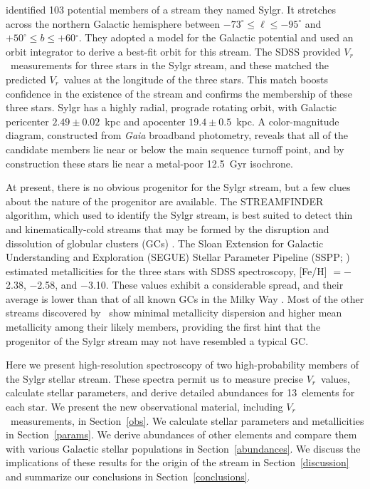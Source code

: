 \documentclass[twocolumn,tighten]{aastex62}
\newcommand{\feh}{{\mathrm{[Fe/H]}}}
\newcommand{\degree}{$^{\circ}$}
\newcommand{\rv}{$V_{r}$}
\begin{document}
identified 103 potential members of a stream
they named Sylgr.
It stretches across the
northern Galactic hemisphere between $-73^\circ \leq \ell \leq -95^\circ$
and $+50^\circ \leq b \leq +60$\degree.
They adopted a model for the Galactic potential and 
used an orbit integrator to derive a best-fit orbit for this stream.
The SDSS provided \rv\ measurements for 
three stars in the Sylgr stream, and these matched the predicted
\rv\ values at the longitude of the three stars.
This match boosts confidence in the existence of the stream and
confirms the membership of these three stars.
Sylgr has a highly radial, prograde rotating orbit,
with Galactic pericenter $2.49 \pm 0.02$~kpc
and apocenter $19.4 \pm 0.5$~kpc.
A color-magnitude diagram, constructed from \textit{Gaia}
broadband photometry, reveals that all of the candidate members
lie near or below the main sequence turnoff point, and
by construction these stars lie near a metal-poor 
12.5~Gyr isochrone.

At present, there is no obvious progenitor for the Sylgr stream,
but a few clues about the nature of the progenitor are available.
The STREAMFINDER algorithm, which  used to
identify the Sylgr stream,
is best suited to detect thin and kinematically-cold streams
that may be formed by the disruption and dissolution of
globular clusters (GCs) \citep{malhan18a,malhan18c}.
The Sloan Extension for Galactic Understanding and Exploration (SEGUE) 
Stellar Parameter Pipeline (SSPP; \citealt{lee08}) 
estimated metallicities
for the three stars with SDSS spectroscopy,
[Fe/H] $= -$2.38, $-$2.58, and $-$3.10.
These values exhibit a considerable spread, and their average
is lower than that of all known GCs in the Milky Way 
\citep[$\feh > -2.4$;][]{carretta14ter8}.
Most of the other streams discovered by \
show minimal metallicity dispersion and higher mean metallicity
among their likely members,
providing the first hint that the progenitor of the Sylgr stream may not
have resembled a typical GC.~

Here we present high-resolution spectroscopy of two
high-probability members of the Sylgr stellar stream.
These spectra permit us to measure precise \rv\ values,
calculate stellar parameters, and 
derive detailed abundances for 13~elements for each star.
We present the new observational material,
including \rv\ measurements,
in Section~\ref{obs}.
We calculate stellar parameters and metallicities
in Section~\ref{params}.
We derive abundances of other elements
and compare them with various Galactic stellar populations
in Section~\ref{abundances}.
We discuss the implications of these results for the origin of the stream
in Section~\ref{discussion}
and summarize our conclusions
in Section~\ref{conclusions}.
\end{document}
